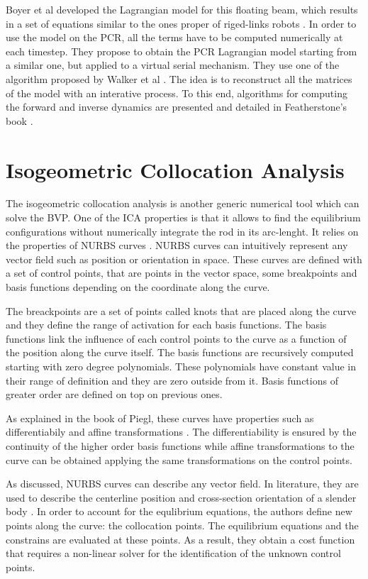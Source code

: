 \documentclass{thesisreport}
\begin{document}
 Boyer et al developed the Lagrangian model for this floating beam, which results in a set of equations similar to the ones proper of riged-links robots \cite{boyer_dynamics_2019}. In order to use the model on the PCR, all the terms have to be computed numerically at each timestep. They propose to obtain the PCR Lagrangian model starting from a similar one, but applied to a virtual serial mechanism. They use one of the algorithm proposed by Walker et al \cite{walker_efficient_1982}. The idea is to reconstruct all the matrices of the model with an interative process. To this end, algorithms for computing the forward and inverse dynamics are presented and detailed in Featherstone's book \cite{featherstone_rigid_2008}.

 
 \section{Isogeometric Collocation Analysis}
 The isogeometric collocation analysis is another generic numerical tool which can solve the BVP. One of the ICA properties is that it allows to find the equilibrium configurations without numerically integrate the rod in its arc-lenght. 
 It relies on the properties of NURBS curves \cite{piegl_nurbs_1997}. NURBS curves can intuitively represent any vector field such as position or orientation in space. These curves are defined with a set of control points, that are points in the vector space, some breakpoints and basis functions depending on the coordinate along the curve.
 
  The breackpoints are a set of points called knots that are placed along the curve and they define the range of activation for each basis functions. The basis functions link the influence of each control points to the curve as a function of the position along the curve itself. The basis functions are recursively computed starting with zero degree polynomials. These polynomials have constant value in their range of definition and they are zero outside from it. Basis functions of greater order are defined on top on previous ones. 
  
 As explained in the book of Piegl, these curves have properties such as differentiabily and affine transformations \cite{piegl_nurbs_1997}. The differentiability is ensured by the continuity of the higher order basis functions while affine transformations to the curve can be obtained applying the same transformations on the control points.
 
 As discussed, NURBS curves can describe any vector field. In literature, they are used to describe the centerline position and cross-section orientation of a slender body \cite{weeger_isogeometric_2017-1}. In order to account for the equlibrium equations, the authors define new points along the curve: the collocation points. The equilibrium equations and the constrains are evaluated at these points. As a result, they obtain a cost function that requires a non-linear solver for the identification of the unknown control points.
 
\end{document}
